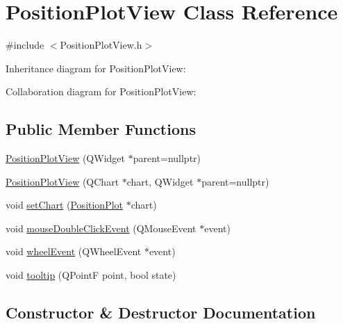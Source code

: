 \hypertarget{class_position_plot_view}{}\section{Position\+Plot\+View Class Reference}
\label{class_position_plot_view}


{\ttfamily \#include $<$Position\+Plot\+View.\+h$>$}



Inheritance diagram for Position\+Plot\+View\+:


Collaboration diagram for Position\+Plot\+View\+:
\subsection*{Public Member Functions}
\begin{DoxyCompactItemize}
\item 
\hyperlink{class_position_plot_view_a1c48f4bdf04758ac27ae1ac8b6e428dc}{Position\+Plot\+View} (Q\+Widget $\ast$parent=nullptr)
\item 
\hyperlink{class_position_plot_view_ac93e8916240d5a987f1a39013e843cb2}{Position\+Plot\+View} (Q\+Chart $\ast$chart, Q\+Widget $\ast$parent=nullptr)
\item 
void \hyperlink{class_position_plot_view_a15a049e5297a4310341fc8f82a931109}{set\+Chart} (\hyperlink{class_position_plot}{Position\+Plot} $\ast$chart)
\item 
void \hyperlink{class_position_plot_view_acc487704e2407556d57fdf59c007b89a}{mouse\+Double\+Click\+Event} (Q\+Mouse\+Event $\ast$event)
\item 
void \hyperlink{class_position_plot_view_a0f4f8d0d4ec6c7eaebb8308ea9206c69}{wheel\+Event} (Q\+Wheel\+Event $\ast$event)
\item 
void \hyperlink{class_position_plot_view_a36123411a3dfa766d8ff34df1f11482e}{tooltip} (Q\+PointF point, bool state)
\end{DoxyCompactItemize}


\subsection{Constructor \& Destructor Documentation}
\mbox{\label{class_position_plot_view_a1c48f4bdf04758ac27ae1ac8b6e428dc}} 
